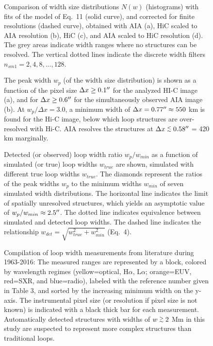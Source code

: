 \documentclass[10pt,preprint]{aastex}  %
\def\arcsec{\hbox{$^{\prime\prime}$}}
\def\gapprox{\lower.4ex\hbox{$\;\buildrel >\over{\scriptstyle\sim}\;$}}
\def\lapprox{\lower.4ex\hbox{$\;\buildrel <\over{\scriptstyle\sim}\;$}}
\begin{document}
\begin{figure}
\caption{Comparison of width size distributions $N(w)$ (histograms)
with fits of the model of Eq.~11 (solid curve), and corrected for
finite resolutions (dashed curve), obtained with AIA (a), HiC scaled 
to AIA resolution (b), HiC (c), and AIA scaled to HiC resolution (d). 
The grey areas indicate width ranges where no structures can be resolved.
The vertical dotted lines indicate the discrete width filters
$n_{sm1}=2, 4, 8, ..., 128$.}
\end{figure}

\begin{figure}
\caption{The peak width $w_p$ (of the width size distribution) is shown
as a function of the pixel size $\Delta x \ge 0.1\arcsec$ for the
analyzed HI-C image (a), and for $\Delta x \ge 0.6\arcsec$ for the
simultaneously observed AIA image (b). At $w_p/\Delta x=3.0$, a minimum 
width of $\Delta x=0.77\arcsec \approx 550$ km is found
for the Hi-C image, below which loop structures are over-resolved
with Hi-C. AIA resolves the structures at $\Delta x \lapprox 0.58\arcsec$
= 420 km marginally.}
\end{figure}
\clearpage

\begin{figure}
\caption{Detected (or observed) loop width ratio $w_p/w_{min}$ 
as a function of simulated (or true) loop widths $w_{true}$
are shown, simulated with different true loop widths $w_{true}$. 
The diamonds represent the ratios of the peak widths $w_p$ to 
the minimum widths $w_{min}$ of seven simulated width distributions. 
The horizontal line indicates the limit of spatially unresolved structures,
which yields an asymptotic value of $w_p/w_{min} \approx 2.5\arcsec$. 
The dotted line indicates equivalence between simulated and detected 
loop widths.  The dashed line indicates the relationship 
$w_{det}=\sqrt{w_{true}^2+w_{min}^2}$ (Eq.~4).}
\end{figure}
\clearpage

\begin{figure}
\caption{Compilation of loop width measurements from literature during
1963-2016: The measured ranges are represented by a block, colored by
wavelength regimes (yellow=optical, H$\alpha$, L$\alpha$; orange=EUV,
red=SXR, and blue=radio), labeled with the reference number given in Table 3,
and sorted by the increasing minimum width on the y-axis.
The instrumental pixel size (or resolution if pixel size is not known) is 
indicated with a black thick bar for each measurement. Automatically
detected structures with widths of $w \gapprox 2$ Mm in this study
are suspected to represent more complex structures than traditional loops.}
\end{figure}
\clearpage
\end{document}
